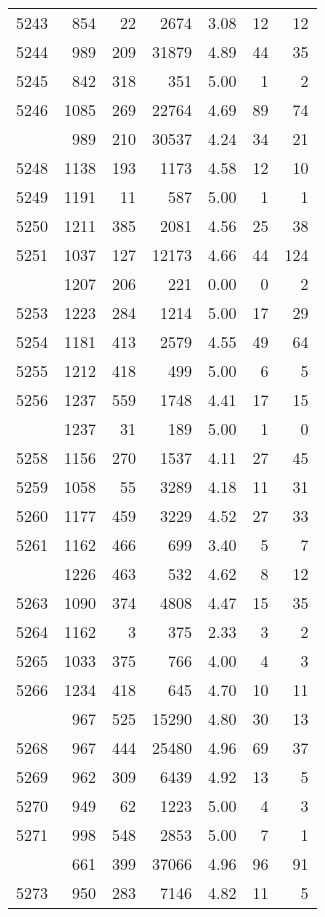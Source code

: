 \documentclass[
]{article}
\begin{document}
\begin{table}
\begin{tabular}[t]{lrrrrrr}
5243 & 854 & 22 & 2674 & 3.08 & 12 & 12\\
5244 & 989 & 209 & 31879 & 4.89 & 44 & 35\\
5245 & 842 & 318 & 351 & 5.00 & 1 & 2\\
5246 & 1085 & 269 & 22764 & 4.69 & 89 & 74\\
\addlinespace
5247 & 989 & 210 & 30537 & 4.24 & 34 & 21\\
5248 & 1138 & 193 & 1173 & 4.58 & 12 & 10\\
5249 & 1191 & 11 & 587 & 5.00 & 1 & 1\\
5250 & 1211 & 385 & 2081 & 4.56 & 25 & 38\\
5251 & 1037 & 127 & 12173 & 4.66 & 44 & 124\\
\addlinespace
5252 & 1207 & 206 & 221 & 0.00 & 0 & 2\\
5253 & 1223 & 284 & 1214 & 5.00 & 17 & 29\\
5254 & 1181 & 413 & 2579 & 4.55 & 49 & 64\\
5255 & 1212 & 418 & 499 & 5.00 & 6 & 5\\
5256 & 1237 & 559 & 1748 & 4.41 & 17 & 15\\
\addlinespace
5257 & 1237 & 31 & 189 & 5.00 & 1 & 0\\
5258 & 1156 & 270 & 1537 & 4.11 & 27 & 45\\
5259 & 1058 & 55 & 3289 & 4.18 & 11 & 31\\
5260 & 1177 & 459 & 3229 & 4.52 & 27 & 33\\
5261 & 1162 & 466 & 699 & 3.40 & 5 & 7\\
\addlinespace
5262 & 1226 & 463 & 532 & 4.62 & 8 & 12\\
5263 & 1090 & 374 & 4808 & 4.47 & 15 & 35\\
5264 & 1162 & 3 & 375 & 2.33 & 3 & 2\\
5265 & 1033 & 375 & 766 & 4.00 & 4 & 3\\
5266 & 1234 & 418 & 645 & 4.70 & 10 & 11\\
\addlinespace
5267 & 967 & 525 & 15290 & 4.80 & 30 & 13\\
5268 & 967 & 444 & 25480 & 4.96 & 69 & 37\\
5269 & 962 & 309 & 6439 & 4.92 & 13 & 5\\
5270 & 949 & 62 & 1223 & 5.00 & 4 & 3\\
5271 & 998 & 548 & 2853 & 5.00 & 7 & 1\\
\addlinespace
5272 & 661 & 399 & 37066 & 4.96 & 96 & 91\\
5273 & 950 & 283 & 7146 & 4.82 & 11 & 5\\

\end{tabular}
\end{table}
\end{document}
